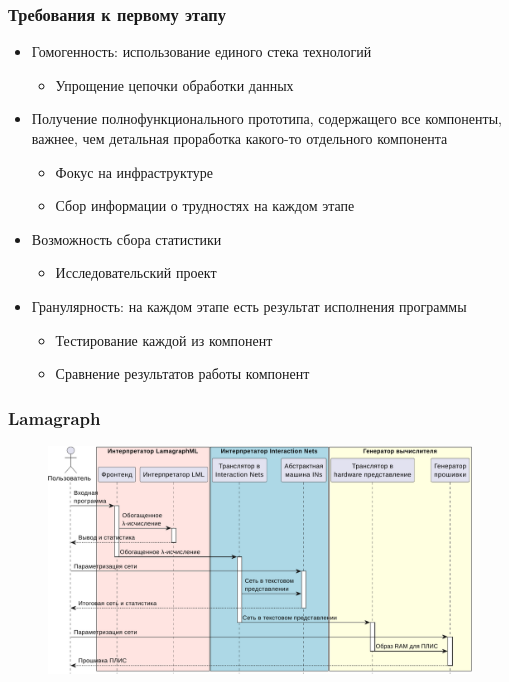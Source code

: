 \documentclass[aspectratio=169]{beamer}
\begin{document}
\begin{frame}
    \frametitle{Требования к первому этапу}

    \begin{itemize}
        \item Гомогенность: использование единого стека технологий
              \begin{itemize}
                  \item Упрощение цепочки обработки данных
              \end{itemize}
        \item Получение полнофункционального прототипа, содержащего все компоненты, важнее, чем детальная проработка какого-то отдельного компонента
              \begin{itemize}
                  \item Фокус на инфраструктуре
                  \item Сбор информации о трудностях на каждом этапе
              \end{itemize}
        \item Возможность сбора статистики
              \begin{itemize}
                  \item Исследовательский проект
              \end{itemize}
        \item Гранулярность: на каждом этапе есть результат исполнения программы
              \begin{itemize}
                  \item Тестирование каждой из компонент
                  \item Сравнение результатов работы компонент
              \end{itemize}
    \end{itemize}

\end{frame}

\begin{frame}
    \frametitle{Lamagraph}

    \begin{figure}
        \includegraphics[width=0.9\linewidth]{pictures/using.pdf}
    \end{figure}

\end{frame}
\end{document}

